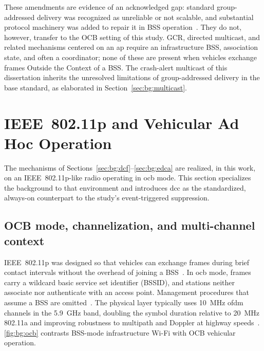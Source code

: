 These amendments are evidence of an acknowledged gap: standard group-addressed delivery was recognized as unreliable or not scalable, and substantial protocol machinery was added to repair it in BSS operation~\cite{kosekszott2012What}.
They do not, however, transfer to the OCB setting of this study.
GCR, directed multicast, and related mechanisms centered on an \gls{ap} require an infrastructure BSS, association state, and often a coordinator; none of these are present when vehicles exchange frames Outside the Context of a BSS.
The crash-alert multicast of this dissertation inherits the unresolved limitations of group-addressed delivery in the base standard, as elaborated in Section~\ref{sec:bg:multicast}.

\section{IEEE~802.11p and Vehicular Ad Hoc Operation}
\label{sec:bg:11p}

The mechanisms of Sections~\ref{sec:bg:dcf}--\ref{sec:bg:edca} are realized, in this work, on an IEEE~802.11p-like radio operating in \gls{ocb} mode.
This section specializes the background to that environment and introduces \gls{dcc} as the standardized, always-on counterpart to the study's event-triggered suppression.

\subsection{OCB mode, channelization, and multi-channel context}
\label{sec:bg:ocb}

IEEE~802.11p was designed so that vehicles can exchange frames during brief contact intervals without the overhead of joining a BSS~\cite{jiang2008ieee80211p}.
In \gls{ocb} mode, frames carry a wildcard basic service set identifier (BSSID), and stations neither associate nor authenticate with an access point.
Management procedures that assume a BSS are omitted~\cite{IEEE80211}.
The physical layer typically uses \SI{10}{\mega\hertz} \gls{ofdm} channels in the \SI{5.9}{\giga\hertz} band, doubling the symbol duration relative to \SI{20}{\mega\hertz} 802.11a and improving robustness to multipath and Doppler at highway speeds~\cite{jiang2008ieee80211p,etsi_en_302663}.
\autoref{fig:bg:ocb} contrasts BSS-mode infrastructure Wi-Fi with OCB vehicular operation.

